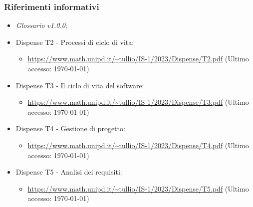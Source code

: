 \documentclass[8pt]{article}
\begin{document}
\subsubsection{Riferimenti informativi}
\begin{itemize}
\setlength\itemsep{0em}
    \item \textit{Glossario v1.0.0};
	\item Dispense T2 - Processi di ciclo di vita:
	\begin{itemize}
		\item
        \href{https://www.math.unipd.it/~tullio/IS-1/2023/Dispense/T2.pdf}{https://www.math.unipd.it/\textasciitilde{}tullio/IS-1/2023/Dispense/T2.pdf} (Ultimo accesso: \today)
	\end{itemize}
	\item Dispense T3 - Il ciclo di vita del software:
	\begin{itemize}
		\item
        \href{https://www.math.unipd.it/~tullio/IS-1/2023/Dispense/T3.pdf}{https://www.math.unipd.it/\textasciitilde{}tullio/IS-1/2023/Dispense/T3.pdf} (Ultimo accesso: \today)
	\end{itemize}
	\item Dispense T4 - Gestione di progetto:
	\begin{itemize}
		\item
        \href{https://www.math.unipd.it/~tullio/IS-1/2023/Dispense/T4.pdf}{https://www.math.unipd.it/\textasciitilde{}tullio/IS-1/2023/Dispense/T4.pdf} (Ultimo accesso: \today)
	\end{itemize}
\item Dispense T5 - Analisi dei requisiti:
	\begin{itemize}
		\item
        \href{https://www.math.unipd.it/~tullio/IS-1/2023/Dispense/T5.pdf}{https://www.math.unipd.it/\textasciitilde{}tullio/IS-1/2023/Dispense/T5.pdf} (Ultimo accesso: \today)
	\end{itemize}
    \end{itemize}
\clearpage
\end{document}
